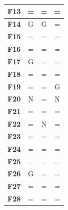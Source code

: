 \documentclass[12pt,a4paper]{report}
\begin{document}
{{{{{{{\begin{table}[h]
\begin{tabular}{|l|c|c|c|}
{\bf F13} & =                               & =                                & =                                \\ \hline
{\bf F14} & G                               & G                                & =                                \\ \hline
{\bf F15} & =                               & =                                & =                                \\ \hline
{\bf F16} & =                               & =                                & =                                \\ \hline
{\bf F17} & G                               & =                                & =                                \\ \hline
{\bf F18} & =                               & =                                & =                                \\ \hline
{\bf F19} & =                               & =                                & G                                \\ \hline
{\bf F20} & N                               & =                                & N                                \\ \hline
{\bf F21} & =                               & =                                & =                                \\ \hline
{\bf F22} & =                               & N                                & =                                \\ \hline
{\bf F23} & =                               & =                                & =                                \\ \hline
{\bf F24} & =                               & =                                & =                                \\ \hline
{\bf F25} & =                               & =                                & =                                \\ \hline
{\bf F26} & G                               & =                                & =                                \\ \hline
{\bf F27} & =                               & =                                & =                                \\ \hline
{\bf F28} & =                               & =                                & =                                \\ \hline
\end{tabular}
\end{table}


}}}}}}}
\end{document}
